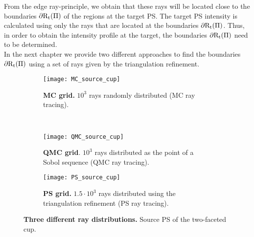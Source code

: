 From the edge ray-principle, we obtain that these rays will be located close to the boundaries $\partial\mbox{$\textup{R}$}_\textrm{t}(\Pi)$ of the regions at the target PS. The target PS intensity is calculated using only the rays that are located at the boundaries $\partial\mbox{$\textup{R}$}_\textrm{t}(\Pi)$. Thus, in order to obtain the intensity profile at the target, the boundaries $\partial\mbox{$\textup{R}$}_\textrm{t}(\Pi)$ need to be determined.\\ \indent 
In the next chapter we provide two different approaches to find the boundaries $\partial\mbox{$\textup{R}$}_\textrm{t}(\Pi)$ using a set of rays given by the triangulation refinement.
\begin{figure}[h]
 \begin{subfigure}[t]{\textwidth}
\centering
    \texttt{[image: MC\_source\_cup]}
    \caption{\textbf{MC grid.} $10^3$ rays randomly distributed (MC ray tracing).}
    \label{fig:mc_sample}
\end{subfigure}
\hfill
\\
\begin{subfigure}[t]{\textwidth}
\centering
    \texttt{[image: QMC\_source\_cup]}
    \caption{\textbf{QMC grid}. $10^3$ rays distributed as the point of a Sobol sequence (QMC ray tracing).}
    \label{fig:qmc_sample}
\end{subfigure}
\hfill
\begin{subfigure}[t]{\textwidth}
\centering
\texttt{[image: PS\_source\_cup]}
\caption{\textbf{PS grid.} $1.5\cdot10^3$ rays distributed using the triangulation refinement (PS ray tracing).}
\label{fig:ps_sample}
\end{subfigure}
\caption{\textbf{Three different ray distributions.} Source PS of the two-faceted cup.}
\label{fig:three_distributions}
\end{figure}


